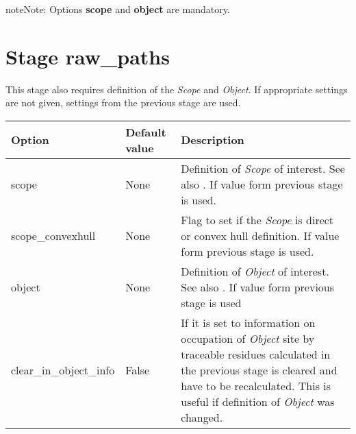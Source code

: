 \documentclass[a4paper,10pt,english]{sphinxmanual}
\begin{document}
\begin{notice}{note}{Note:}
Options \textbf{scope} and \textbf{object} are mandatory.
\end{notice}


\section{Stage \textbf{raw\_paths}}
\label{valve/valve_config:stage-raw-paths}
This stage also requires definition of the \emph{Scope} and \emph{Object}. If appropriate settings are not given, settings from the previous stage are used.

\noindent\begin{tabulary}{\linewidth}{|L|L|L|}
\hline
\textsf{\relax 
Option
\unskip}\relax &\textsf{\relax 
Default value
\unskip}\relax &\textsf{\relax 
Description
\unskip}\relax \\
\hline
scope
&
None
&
Definition of \emph{Scope} of interest. See also
{\hyperref[valve/valve_manual:scope\string-definition]{}}. If  value form previous stage
is used.
\\
\hline
scope\_convexhull
&
None
&
Flag to set if the \emph{Scope} is direct or convex hull definition.
If  value form previous stage is used.
\\
\hline
object
&
None
&
Definition of \emph{Object} of interest. See also
{\hyperref[valve/valve_manual:object\string-definition]{}}. If  value form previous stage
is used
\\
\hline
clear\_in\_object\_info
&
False
&
If it is set to  information on occupation of \emph{Object}
site by traceable residues calculated in the previous stage is
cleared and have to be recalculated. This is useful if
definition of \emph{Object} was changed.
\\
\hline\end{tabulary}
\end{document}
